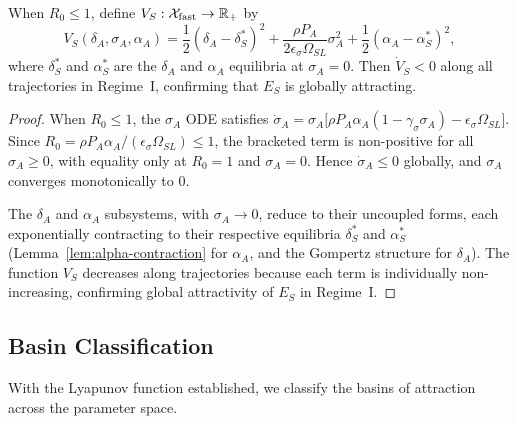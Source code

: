 \begin{proposition}
\label{prop:lyapunov-es}
When $R_0 \leq 1$, define $V_S: \mathcal{X}_{\mathrm{fast}} \to \mathbb{R}_+$ by
\[
V_S(\delta_A, \sigma_A, \alpha_A) =
\frac{1}{2}(\delta_A - \delta^*_S)^2
+ \frac{\rho P_A}{2\epsilon_\sigma \Omega_{SL}} \sigma_A^2
+ \frac{1}{2}(\alpha_A - \alpha^*_S)^2,
\]
where $\delta^*_S$ and $\alpha^*_S$ are the $\delta_A$ and $\alpha_A$
equilibria at $\sigma_A = 0$. Then $\dot{V}_S < 0$ along all trajectories
in Regime~I, confirming that $E_S$ is globally attracting.
\end{proposition}

\begin{proof}
When $R_0 \leq 1$, the $\sigma_A$ ODE satisfies
$\dot{\sigma}_A = \sigma_A \bigl[ \rho P_A \alpha_A (1 - \gamma_\sigma \sigma_A)
- \epsilon_\sigma \Omega_{SL} \bigr]$.
Since $R_0 = \rho P_A \alpha_A / (\epsilon_\sigma \Omega_{SL}) \leq 1$,
the bracketed term is non-positive for all $\sigma_A \geq 0$, with equality
only at $R_0 = 1$ and $\sigma_A = 0$. Hence $\dot{\sigma}_A \leq 0$
globally, and $\sigma_A$ converges monotonically to $0$.

The $\delta_A$ and $\alpha_A$ subsystems, with $\sigma_A \to 0$, reduce
to their uncoupled forms, each exponentially contracting to their
respective equilibria $\delta^*_S$ and $\alpha^*_S$ (Lemma~\ref{lem:alpha-contraction}
for $\alpha_A$, and the Gompertz structure for $\delta_A$). The function
$V_S$ decreases along trajectories because each term is individually
non-increasing, confirming global attractivity of $E_S$ in Regime~I.
\end{proof}

\subsection{Basin Classification}

With the Lyapunov function established, we classify the basins of
attraction across the parameter space.

